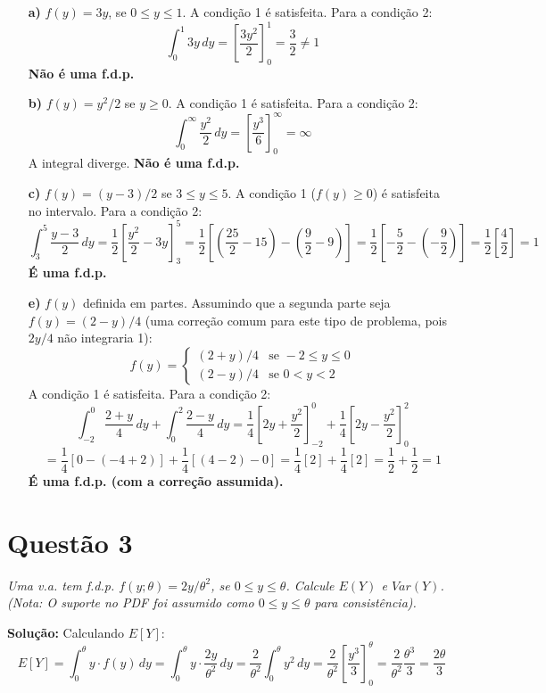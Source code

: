 \documentclass[12pt, a4paper]{article}
\begin{document}
\begin{itemize}
    \item[\textbf{a)}] $f(y)=3y$, se $0\le y\le1$.
        A condição 1 é satisfeita. Para a condição 2:
        $$ \int_{0}^{1} 3y \,dy = \left[ \frac{3y^2}{2} \right]_{0}^{1} = \frac{3}{2} \neq 1 $$
        \textbf{Não é uma f.d.p.}

    \item[\textbf{b)}] $f(y)=y^{2}/2$ se $y\ge0$.
        A condição 1 é satisfeita. Para a condição 2:
        $$ \int_{0}^{\infty} \frac{y^2}{2} \,dy = \left[ \frac{y^3}{6} \right]_{0}^{\infty} = \infty $$
        A integral diverge. \textbf{Não é uma f.d.p.}

    \item[\textbf{c)}] $f(y)=(y-3)/2$ se $3\le y\le5$.
        A condição 1 ($f(y) \ge 0$) é satisfeita no intervalo. Para a condição 2:
        $$ \int_{3}^{5} \frac{y-3}{2} \,dy = \frac{1}{2} \left[ \frac{y^2}{2} - 3y \right]_{3}^{5} = \frac{1}{2} \left[ (\frac{25}{2}-15) - (\frac{9}{2}-9) \right] = \frac{1}{2} [-\frac{5}{2} - (-\frac{9}{2})] = \frac{1}{2} [\frac{4}{2}] = 1 $$
        \textbf{É uma f.d.p.}

    \item[\textbf{e)}] $f(y)$ definida em partes. Assumindo que a segunda parte seja $f(y)=(2-y)/4$ (uma correção comum para este tipo de problema, pois $2y/4$ não integraria 1):
        $$ f(y) = \begin{cases} (2+y)/4 & \text{se } -2 \le y \le 0 \\ (2-y)/4 & \text{se } 0 < y < 2 \end{cases} $$
        A condição 1 é satisfeita. Para a condição 2:
        $$ \int_{-2}^{0} \frac{2+y}{4} \,dy + \int_{0}^{2} \frac{2-y}{4} \,dy = \frac{1}{4}\left[2y+\frac{y^2}{2}\right]_{-2}^{0} + \frac{1}{4}\left[2y-\frac{y^2}{2}\right]_{0}^{2} $$
        $$ = \frac{1}{4}[0 - (-4+2)] + \frac{1}{4}[(4-2)-0] = \frac{1}{4}[2] + \frac{1}{4}[2] = \frac{1}{2} + \frac{1}{2} = 1 $$
        \textbf{É uma f.d.p. (com a correção assumida).}
\end{itemize}

\section*{Questão 3}
\textit{Uma v.a. tem f.d.p. $f(y;\theta)=2y/\theta^{2}$, se $0\le y\le\theta$. Calcule $E(Y)$ e $Var(Y)$. (Nota: O suporte no PDF foi assumido como $0\le y\le\theta$ para consistência).}

\textbf{Solução:}
Calculando $E[Y]$:
$$ E[Y] = \int_{0}^{\theta} y \cdot f(y) \,dy = \int_{0}^{\theta} y \cdot \frac{2y}{\theta^2} \,dy = \frac{2}{\theta^2} \int_{0}^{\theta} y^2 \,dy = \frac{2}{\theta^2} \left[\frac{y^3}{3}\right]_{0}^{\theta} = \frac{2}{\theta^2} \frac{\theta^3}{3} = \frac{2\theta}{3} $$
\end{document}
